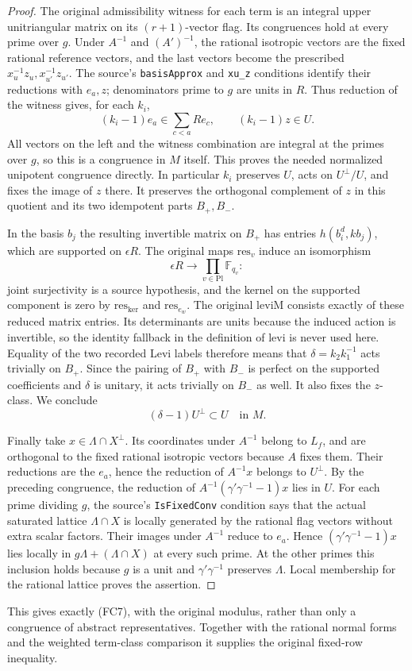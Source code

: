 \begin{proof}
The original admissibility witness for each term is
an integral upper unitriangular matrix on its
\((r+1)\)-vector flag. Its congruences hold at every
prime over \(g\). Under \(A^{-1}\) and \((A')^{-1}\),
the rational isotropic vectors are the fixed rational
reference vectors, and the last vectors become the
prescribed \(x_u^{-1}z_u,x_{u'}^{-1}z_{u'}\).
The source's \texttt{basisApprox} and \texttt{xu\_z}
conditions identify their reductions with \(e_a,z\);
denominators prime to \(g\) are units in \(R\).
Thus reduction of the witness gives, for each \(k_i\),
\[
 (k_i-1)e_a\in\sum_{c<a}Re_c,\qquad
 (k_i-1)z\in U .
\]
All vectors on the left and the witness combination
are integral at the primes over \(g\), so this is a
congruence in \(M\) itself. This proves the needed
normalized unipotent congruence directly.
In particular \(k_i\) preserves \(U\), acts on
\(U^\perp/U\), and fixes the image of \(z\) there.
It preserves the orthogonal complement of \(z\) in
this quotient and its two idempotent parts
\(B_+,B_-\).

In the basis \(b_j\) the resulting invertible matrix
on \(B_+\) has entries \(h(b_i^d,k b_j)\), which are
supported on \(\epsilon R\). The original maps
\(\mathrm{res}_v\) induce an isomorphism
\[
 \epsilon R \longrightarrow \prod_{v\in\mathrm{Pl}}\mathbb F_{q_v} :
\]
joint surjectivity is a source hypothesis, and the
kernel on the supported component is zero by
\(\mathrm{res}_{\mathrm{ker}}\) and
\(\mathrm{res}_{e_w}\).
The original \(\mathrm{leviM}\) consists exactly of
these reduced matrix entries. Its determinants
are units because the induced action is invertible,
so the identity fallback in the definition of
\(\mathrm{levi}\) is never used here.
Equality of the two recorded Levi labels therefore
means that \(\delta=k_2 k_1^{-1}\) acts trivially on
\(B_+\). Since the pairing of \(B_+\) with \(B_-\)
is perfect on the supported coefficients and
\(\delta\) is unitary, it acts trivially on \(B_-\)
as well. It also fixes the \(z\)-class. We conclude
\[
 (\delta-1)U^\perp\subset U
 \quad\text{in } M.
\]

Finally take \(x\in\Lambda\cap X^\perp\).
Its coordinates under \(A^{-1}\) belong to \(L_f\),
and are orthogonal to the fixed rational isotropic
vectors because \(A\) fixes them.
Their reductions are the \(e_a\), hence the
reduction of \(A^{-1}x\) belongs to \(U^\perp\).
By the preceding congruence, the reduction of
\(A^{-1}(\gamma'\gamma^{-1}-1)x\) lies in \(U\).
For each prime dividing \(g\), the source's
\texttt{IsFixedConv} condition says that the
actual saturated lattice \(\Lambda\cap X\) is
locally generated by the rational flag vectors
without extra scalar factors. Their images under
\(A^{-1}\) reduce to \(e_a\). Hence
\((\gamma'\gamma^{-1}-1)x\) lies locally in
\(g\Lambda+(\Lambda\cap X)\) at every such prime.
At the other primes this inclusion holds because
\(g\) is a unit and \(\gamma'\gamma^{-1}\) preserves
\(\Lambda\). Local membership for the rational
lattice proves the assertion.
\end{proof}

This gives exactly (FC7), with the original modulus,
rather than only a congruence of abstract representatives.
Together with the rational normal forms and the
weighted term-class comparison it supplies the original
fixed-row inequality.
